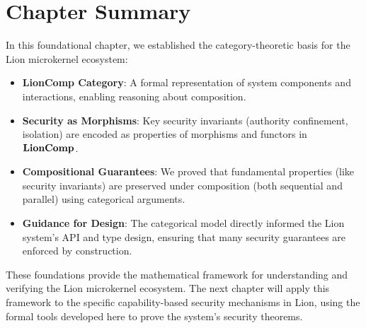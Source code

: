 \section{Chapter Summary}

In this foundational chapter, we established the category-theoretic basis for the Lion microkernel ecosystem:

\begin{itemize}
\item \textbf{LionComp Category}: A formal representation of system components and interactions, enabling reasoning about composition.
\item \textbf{Security as Morphisms}: Key security invariants (authority confinement, isolation) are encoded as properties of morphisms and functors in $\mathbf{LionComp}$.
\item \textbf{Compositional Guarantees}: We proved that fundamental properties (like security invariants) are preserved under composition (both sequential and parallel) using categorical arguments.
\item \textbf{Guidance for Design}: The categorical model directly informed the Lion system's API and type design, ensuring that many security guarantees are enforced by construction.
\end{itemize}

These foundations provide the mathematical framework for understanding and verifying the Lion microkernel ecosystem. The next chapter will apply this framework to the specific capability-based security mechanisms in Lion, using the formal tools developed here to prove the system's security theorems.

\newpage

